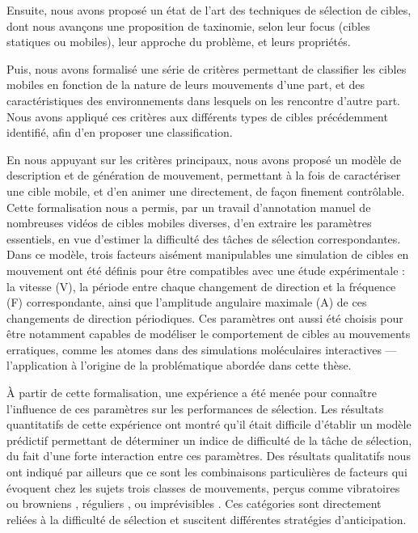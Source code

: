 	Ensuite, nous avons proposé un état de l'art des techniques de sélection de cibles, dont nous avançons une proposition de taxinomie, selon leur focus (cibles statiques ou mobiles), leur approche du problème, et leurs propriétés.
	
	Puis, nous avons formalisé une série de critères permettant de classifier les cibles mobiles en fonction de la nature de leurs mouvements d'une part, et des caractéristiques des environnements dans lesquels on les rencontre d'autre part. Nous avons appliqué ces critères aux différents types de cibles précédemment identifié, afin d'en proposer une classification.
	
	En nous appuyant sur les critères principaux, nous avons proposé un modèle de description et de génération de mouvement, permettant à la fois de caractériser une cible mobile, et d'en animer une directement, de façon finement contrôlable. Cette formalisation nous a permis, par un travail d'annotation manuel de nombreuses vidéos de cibles mobiles diverses, d'en extraire les paramètres essentiels, en vue d'estimer la difficulté des tâches de sélection correspondantes. Dans ce modèle, trois facteurs aisément manipulables une simulation de cibles en mouvement ont été définis pour être compatibles avec une étude expérimentale : la vitesse (V), la période entre chaque changement de direction et la fréquence (F) correspondante, ainsi que l'amplitude angulaire maximale (A) de ces changements de direction périodiques. Ces paramètres ont aussi été choisis pour être notamment capables de modéliser le comportement de cibles au mouvements erratiques, comme les atomes dans des simulations moléculaires interactives --- l’application à l’origine de la problématique abordée dans cette thèse.

	À partir de cette formalisation, une expérience a été menée pour connaître l'influence de ces paramètres sur les performances de sélection. Les résultats quantitatifs de cette expérience ont montré qu'il était difficile d'établir un modèle prédictif permettant de déterminer un indice de difficulté de la tâche de sélection, du fait d'une forte interaction entre ces paramètres. Des résultats qualitatifs nous ont indiqué par ailleurs que ce sont les combinaisons particulières de facteurs qui évoquent chez les sujets trois classes de mouvements, perçus comme \og vibratoires \fg{} ou \og browniens \fg{}, \og réguliers \fg{}, ou \og imprévisibles \fg{}. Ces catégories sont directement reliées à la difficulté de sélection et suscitent différentes stratégies d'anticipation.

